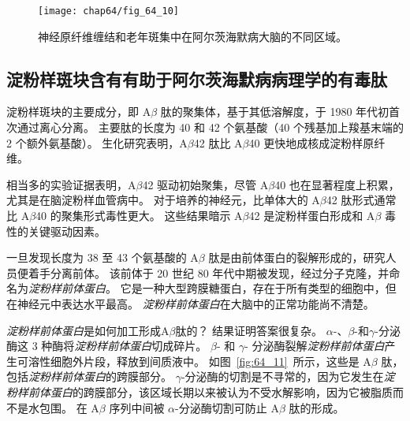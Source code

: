 \begin{figure}[htbp]
	\centering
	\texttt{[image: chap64/fig\_64\_10]}
	\caption{神经原纤维缠结和老年斑集中在阿尔茨海默病大脑的不同区域\cite{arnold1991topographical}。}
	\label{fig:64_10}
\end{figure}



\subsection{淀粉样斑块含有有助于阿尔茨海默病病理学的有毒肽}

淀粉样斑块的主要成分，即 A$\beta$ 肽的聚集体，基于其低溶解度，于 1980 年代初首次通过离心分离。
主要肽的长度为 40 和 42 个氨基酸（40 个残基加上羧基末端的 2 个额外氨基酸）。
生化研究表明，A$\beta$42 肽比 A$\beta$40 更快地成核成淀粉样原纤维。


相当多的实验证据表明，A$\beta$42 驱动初始聚集，尽管 A$\beta$40 也在显著程度上积累，尤其是在脑淀粉样血管病中。
对于培养的神经元，比单体大的 A$\beta$42 肽形式通常比 A$\beta$40 的聚集形式毒性更大。
这些结果暗示 A$\beta$42 是淀粉样蛋白形成和 A$\beta$ 毒性的关键驱动因素。


一旦发现长度为 38 至 43 个氨基酸的 A$\beta$ 肽是由前体蛋白的裂解形成的，研究人员便着手分离前体。
该前体于 20 世纪 80 年代中期被发现，经过分子克隆，并命名为\textit{淀粉样前体蛋白}。
它是一种大型跨膜糖蛋白，存在于所有类型的细胞中，但在神经元中表达水平最高。
\textit{淀粉样前体蛋白}在大脑中的正常功能尚不清楚。


\textit{淀粉样前体蛋白}是如何加工形成A$\beta$肽的？
结果证明答案很复杂。
$\alpha$-、$\beta$-和$\gamma$-分泌酶这 3 种酶将\textit{淀粉样前体蛋白}切成碎片。
$\beta$- 和 $\gamma$- 分泌酶裂解\textit{淀粉样前体蛋白}产生可溶性细胞外片段，释放到间质液中。
如图~\ref{fig:64_11}~所示，这些是 A$\beta$ 肽，包括\textit{淀粉样前体蛋白}的跨膜部分。
$\gamma$-分泌酶的切割是不寻常的，因为它发生在\textit{淀粉样前体蛋白}的跨膜部分，该区域长期以来被认为不受水解影响，因为它被脂质而不是水包围。
在 A$\beta$ 序列中间被 $\alpha$-分泌酶切割可防止 A$\beta$ 肽的形成。



